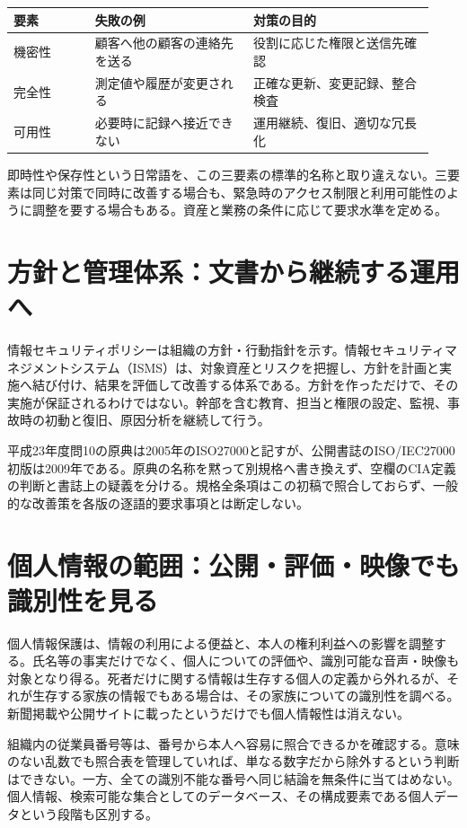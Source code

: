 \begin{center}
\begin{tabular}{@{}p{0.18\linewidth}p{0.35\linewidth}p{0.40\linewidth}@{}}
\toprule
要素 & 失敗の例 & 対策の目的\\
\midrule
機密性 & 顧客へ他の顧客の連絡先を送る & 役割に応じた権限と送信先確認\\
完全性 & 測定値や履歴が変更される & 正確な更新、変更記録、整合検査\\
可用性 & 必要時に記録へ接近できない & 運用継続、復旧、適切な冗長化\\
\bottomrule
\end{tabular}
\end{center}
即時性や保存性という日常語を、この三要素の標準的名称と取り違えない。三要素は同じ対策で同時に改善する場合も、緊急時のアクセス制限と利用可能性のように調整を要する場合もある。資産と業務の条件に応じて要求水準を定める。

\section{方針と管理体系：文書から継続する運用へ}
\label{theory:information:management}
情報セキュリティポリシーは組織の方針・行動指針を示す。情報セキュリティマネジメントシステム（ISMS）は、対象資産とリスクを把握し、方針を計画と実施へ結び付け、結果を評価して改善する体系である。方針を作っただけで、その実施が保証されるわけではない。幹部を含む教育、担当と権限の設定、監視、事故時の初動と復旧、原因分析を継続して行う。

平成23年度問10の原典は2005年のISO27000と記すが、公開書誌のISO/IEC27000初版は2009年である\parencite{iso27000_2009}。原典の名称を黙って別規格へ書き換えず、空欄のCIA定義の判断と書誌上の疑義を分ける。規格全条項はこの初稿で照合しておらず、一般的な改善策を各版の逐語的要求事項とは断定しない。

\section{個人情報の範囲：公開・評価・映像でも識別性を見る}
\label{theory:privacy:scope}
個人情報保護は、情報の利用による便益と、本人の権利利益への影響を調整する。氏名等の事実だけでなく、個人についての評価や、識別可能な音声・映像も対象となり得る。死者だけに関する情報は生存する個人の定義から外れるが、それが生存する家族の情報でもある場合は、その家族についての識別性を調べる。新聞掲載や公開サイトに載ったというだけでも個人情報性は消えない\parencite{privacy_general}。

組織内の従業員番号等は、番号から本人へ容易に照合できるかを確認する。意味のない乱数でも照合表を管理していれば、単なる数字だから除外するという判断はできない。一方、全ての識別不能な番号へ同じ結論を無条件に当てはめない。個人情報、検索可能な集合としてのデータベース、その構成要素である個人データという段階も区別する。

